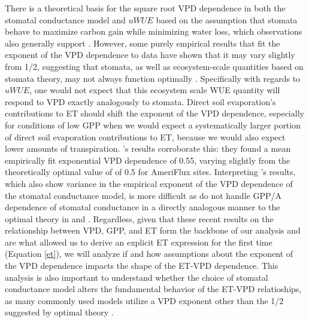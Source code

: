 \documentclass[draft,linenumbers]{agujournal}
\begin{document}
There is a theoretical basis for the square root VPD dependence in
both the stomatal conductance model and $uWUE$ based on the assumption
that stomata behave to maximize carbon gain while minimizing water
loss, which observations also generally support \citep{Lloyd_1991,
  MEDLYN_2011, Lin_2015, Zhou_2014, Zhou_2015, Medlyn_2017}. However,
some purely empirical results that fit the exponent of the VPD
dependence to data have shown that it may vary slightly from 1/2,
suggesting that stomata, as well as ecosystem-scale quantities based
on stomata theory, may not always function optimally \citep{Zhou_2015,
  Lin_2018}. Specifically with regards to $uWUE$, one would not expect
that this ecosystem scale WUE quantity will respond to VPD exactly
analogously to stomata. Direct soil evaporation's contributions to ET
should shift the exponent of the VPD dependence, especially for
conditions of low GPP when we would expect a systematically larger
portion of direct soil evaporation contributions to ET, because we
would also expect lower amounts of transpiration. \citet{Zhou_2015}'s
results corroborate this: they found a mean empirically fit
exponential VPD dependence of 0.55, varying slightly from the
theoretically optimal value of of 0.5 for AmeriFlux
sites. Interpreting \citet{Lin_2018}'s results, which also show
variance in the empirical exponent of the VPD dependence of the
stomatal conductance model, is more difficult as \citet{Lin_2018} do
not handle GPP/A dependence of stomatal conductance in a directly
analogous manner to the optimal theory in \citet{MEDLYN_2011} and
\citet{Medlyn_2017}. Regardless, given that these recent results on
the relationship between VPD, GPP, and ET \citep{MEDLYN_2011,
  Zhou_2014, Zhou_2015, Medlyn_2017} form the backbone of our analysis
and are what allowed us to derive an explicit ET expression for the
first time (Equation \ref{et}), we will analyze if and how assumptions
about the exponent of the VPD dependence impacts the shape of the
ET-VPD dependence. This analysis is also important to understand whether the choice of stomatal conductance model alters the fundamental behavior of the ET-VPD relatioships, as many commonly used models  utilize a VPD exponent other than the 1/2 suggested by optimal theory \citep[e.g. ][ which uses an exponent of 1]{Leuning_1990}.
\end{document}
